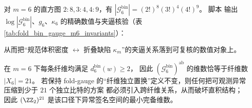 \begin{remark}[\texorpdfstring{$m=6$}{m=6} 的 gauge 体积数值锚点]\label{rem:fold-bin-gauge-volume-m6}
对 \(m=6\) 的直方图 \(2:8,3:4,4:9\)，有
\(
|\mathcal{G}^{\mathrm{bin}}_6|=(2!)^{8}(3!)^{4}(4!)^{9}
\)。
脚本 \texttt{} 输出
\(\log|\mathcal{G}^{\mathrm{bin}}_6|\)、\(g_6\)、\(\kappa_6\) 的精确数值与夹逼核验（表 \ref{tab:fold_bin_gauge_m6_invariants}）：

从而把“规范体积密度 \(\leftrightarrow\) 折叠缺陷 \(\kappa_m\)”的夹逼关系落到可复核的数值对象上。
\end{remark}

\begin{remark}[异常签名维数的不可压缩性（\texorpdfstring{$m=6$}{m=6}）]\label{rem:fold-bin-gauge-rigidity}
在 \(m=6\) 下每条纤维均满足 \(d^{\mathrm{bin}}_6(w)\ge 2\)，
因此 \((\mathcal{G}^{\mathrm{bin}}_6)^{\mathrm{ab}}\) 的维数恰等于纤维数 \(|X_6|=21\)。
若保持 fold-gauge 的“纤维独立置换”定义不变，则任何把可观测异常压缩到少于 \(21\) 个独立比特的方案
都必须引入跨纤维关系，从而破坏直积结构；
因此 \((\ZZ_2)^{21}\) 是该口径下异常签名空间的最小完备维数。
\end{remark}
